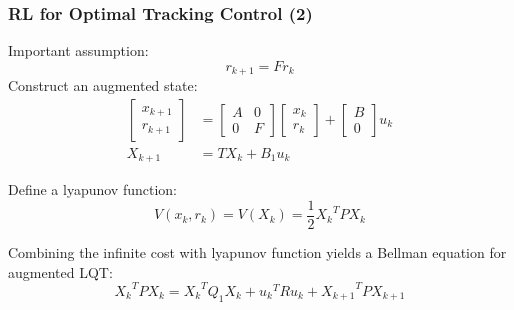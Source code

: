 \documentclass{beamer}
\begin{document}
			\begin{frame}\frametitle{RL for Optimal Tracking Control (2)}
				\vspace{3mm}
				\fontsize{8}{4}\selectfont
				Important assumption:
				\begin{equation}
				r_{k+1} = Fr_k
				\end{equation}
				Construct an augmented state:
				\begin{equation}
				\begin{split}
				\left[ \begin{array}{c}
				x_{k+1} \\ 
				r_{k+1}
				\end{array} \right] &= \left[\begin{array}{cc}
				A & \text{0} \\ 
				\text{0} & F
				\end{array}  \right] \left[ \begin{array}{c}
				x_k \\ 
				r_k
				\end{array} \right] + \left[ \begin{array}{c}
				B \\ 
				\text{0}
				\end{array} \right] u_k \\
				X_{k+1} &= TX_k + B_1u_k
				\end{split}
				\end{equation}
				\begin{definition}
					\fontsize{8}{4}\selectfont
					Define a lyapunov function:
					\begin{equation}
					V(x_k, r_k) = V(X_k) = \frac{1}{2}{X_k}^TPX_k
					\end{equation}
				\end{definition}
				\vspace{3mm}
				\fontsize{8}{4}\selectfont
				Combining the infinite cost with lyapunov function yields a Bellman equation for augmented LQT: 
				\begin{equation}
				{X_k}^TPX_k =  {X_k}^TQ_1X_k + {u_k}^TRu_k + {X_{k+1}}^TPX_{k+1}
				\end{equation}
			\end{frame}
			
\end{document}
